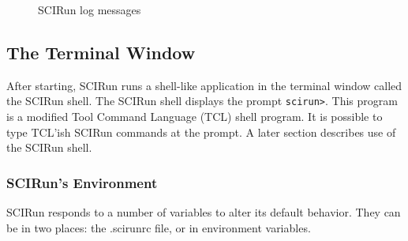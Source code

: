 \documentclass[fleqn,12pt,openany]{book}
\begin{document}
\begin{customdesc}
\begin{customdesc}
\begin{figure}[H]\label{log_window}
\begin{centering}
\caption{SCIRun log messages}
\end{centering}
\end{figure}
  \end{customdesc}
\end{customdesc}

\subsection{The Terminal Window}

After starting, SCIRun runs a shell-like application in the terminal window called the SCIRun shell.
The SCIRun shell displays the prompt \texttt{scirun>}.
This program is a modified Tool Command Language (TCL) shell program.
It is possible to type TCL'ish SCIRun commands at the prompt.
A later section describes use of the SCIRun shell.

\subsubsection{SCIRun's Environment}
SCIRun responds to a number of variables to alter its default behavior.
They can be in two places: the .scirunrc file, or in environment variables.
\end{document}
